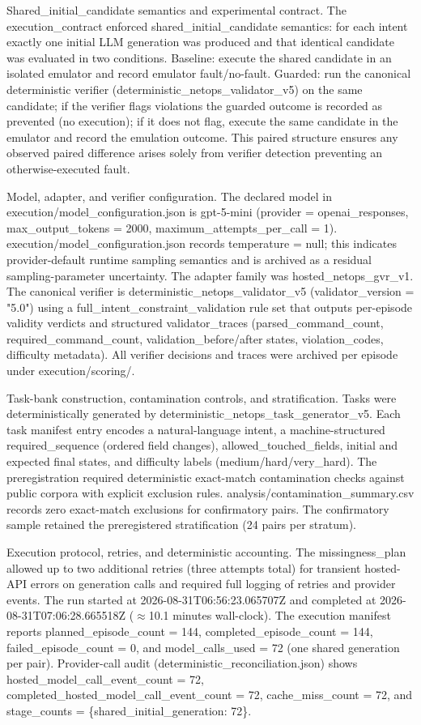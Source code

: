 \documentclass[conference]{IEEEtran}
\begin{document}
Shared\_initial\_candidate semantics and experimental contract. The execution\_contract enforced shared\_initial\_candidate semantics: for each intent exactly one initial LLM generation was produced and that identical candidate was evaluated in two conditions. Baseline: execute the shared candidate in an isolated emulator and record emulator fault/no-fault. Guarded: run the canonical deterministic verifier (deterministic\_netops\_validator\_v5) on the same candidate; if the verifier flags violations the guarded outcome is recorded as prevented (no execution); if it does not flag, execute the same candidate in the emulator and record the emulation outcome. This paired structure ensures any observed paired difference arises solely from verifier detection preventing an otherwise-executed fault.

Model, adapter, and verifier configuration. The declared model in execution/model\_configuration.json is gpt-5-mini (provider = openai\_responses, max\_output\_tokens = 2000, maximum\_attempts\_per\_call = 1). execution/model\_configuration.json records temperature = null; this indicates provider-default runtime sampling semantics and is archived as a residual sampling-parameter uncertainty. The adapter family was hosted\_netops\_gvr\_v1. The canonical verifier is deterministic\_netops\_validator\_v5 (validator\_version = "5.0") using a full\_intent\_constraint\_validation rule set that outputs per-episode validity verdicts and structured validator\_traces (parsed\_command\_count, required\_command\_count, validation\_before/after states, violation\_codes, difficulty metadata). All verifier decisions and traces were archived per episode under execution/scoring/.

Task-bank construction, contamination controls, and stratification. Tasks were deterministically generated by deterministic\_netops\_task\_generator\_v5. Each task manifest entry encodes a natural-language intent, a machine-structured required\_sequence (ordered field changes), allowed\_touched\_fields, initial and expected final states, and difficulty labels (medium/hard/very\_hard). The preregistration required deterministic exact-match contamination checks against public corpora with explicit exclusion rules. analysis/contamination\_summary.csv records zero exact-match exclusions for confirmatory pairs. The confirmatory sample retained the preregistered stratification (24 pairs per stratum).

Execution protocol, retries, and deterministic accounting. The missingness\_plan allowed up to two additional retries (three attempts total) for transient hosted-API errors on generation calls and required full logging of retries and provider events. The run started at 2026-08-31T06:56:23.065707Z and completed at 2026-08-31T07:06:28.665518Z (\ensuremath{\approx}10.1 minutes wall-clock). The execution manifest reports planned\_episode\_count = 144, completed\_episode\_count = 144, failed\_episode\_count = 0, and model\_calls\_used = 72 (one shared generation per pair). Provider-call audit (deterministic\_reconciliation.json) shows hosted\_model\_call\_event\_count = 72, completed\_hosted\_model\_call\_event\_count = 72, cache\_miss\_count = 72, and stage\_counts = \{shared\_initial\_generation: 72\}.
\end{document}
